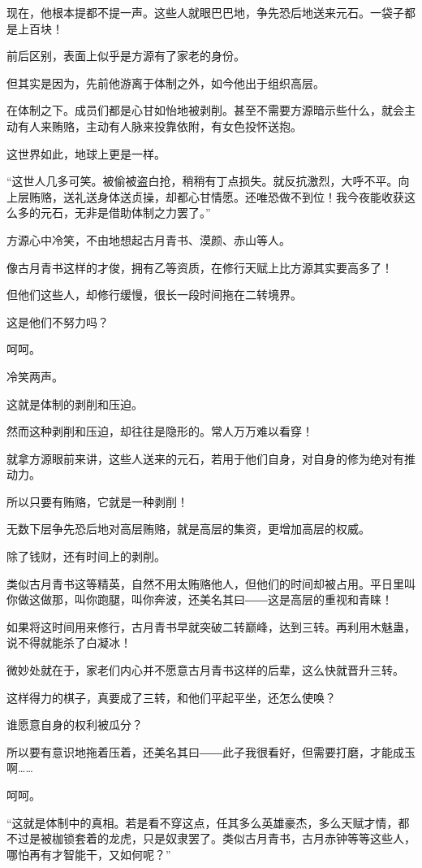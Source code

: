 \begin{this_body}
现在，他根本提都不提一声。这些人就眼巴巴地，争先恐后地送来元石。一袋子都是上百块！

前后区别，表面上似乎是方源有了家老的身份。

但其实是因为，先前他游离于体制之外，如今他出于组织高层。

在体制之下。成员们都是心甘如怡地被剥削。甚至不需要方源暗示些什么，就会主动有人来贿赂，主动有人脉来投靠依附，有女色投怀送抱。

这世界如此，地球上更是一样。

“这世人几多可笑。被偷被盗白抢，稍稍有丁点损失。就反抗激烈，大呼不平。向上层贿赂，送礼送身体送贞操，却都心甘情愿。还唯恐做不到位！我今夜能收获这么多的元石，无非是借助体制之力罢了。”

方源心中冷笑，不由地想起古月青书、漠颜、赤山等人。

像古月青书这样的才俊，拥有乙等资质，在修行天赋上比方源其实要高多了！

但他们这些人，却修行缓慢，很长一段时间拖在二转境界。

这是他们不努力吗？

呵呵。

冷笑两声。

这就是体制的剥削和压迫。

然而这种剥削和压迫，却往往是隐形的。常人万万难以看穿！

就拿方源眼前来讲，这些人送来的元石，若用于他们自身，对自身的修为绝对有推动力。

所以只要有贿赂，它就是一种剥削！

无数下层争先恐后地对高层贿赂，就是高层的集资，更增加高层的权威。

除了钱财，还有时间上的剥削。

类似古月青书这等精英，自然不用太贿赂他人，但他们的时间却被占用。平日里叫你做这做那，叫你跑腿，叫你奔波，还美名其曰――这是高层的重视和青睐！

如果将这时间用来修行，古月青书早就突破二转巅峰，达到三转。再利用木魅蛊，说不得就能杀了白凝冰！

微妙处就在于，家老们内心并不愿意古月青书这样的后辈，这么快就晋升三转。

这样得力的棋子，真要成了三转，和他们平起平坐，还怎么使唤？

谁愿意自身的权利被瓜分？

所以要有意识地拖着压着，还美名其曰――此子我很看好，但需要打磨，才能成玉啊……

呵呵。

“这就是体制中的真相。若是看不穿这点，任其多么英雄豪杰，多么天赋才情，都不过是被枷锁套着的龙虎，只是奴隶罢了。类似古月青书，古月赤钟等等这些人，哪怕再有才智能干，又如何呢？”


\end{this_body}
